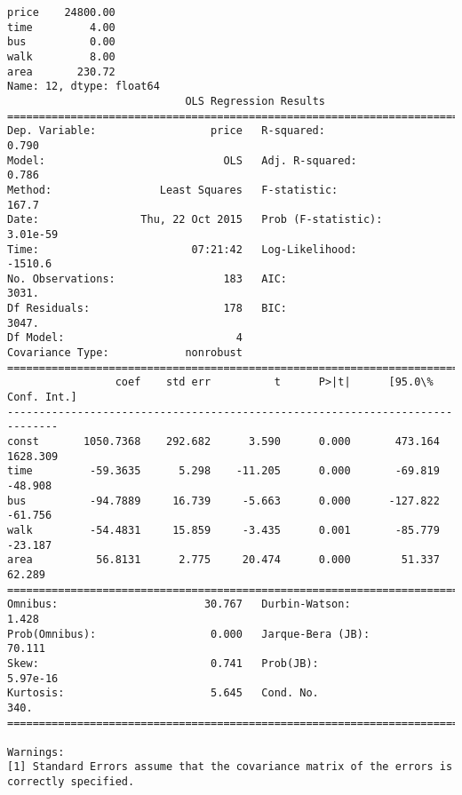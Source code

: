 \documentclass[a4paper,dvipdfmx]{jsarticle}
\begin{document}
    \begin{Verbatim}[commandchars=\\\{\}]
price    24800.00
time         4.00
bus          0.00
walk         8.00
area       230.72
Name: 12, dtype: float64
                            OLS Regression Results                            
==============================================================================
Dep. Variable:                  price   R-squared:                       0.790
Model:                            OLS   Adj. R-squared:                  0.786
Method:                 Least Squares   F-statistic:                     167.7
Date:                Thu, 22 Oct 2015   Prob (F-statistic):           3.01e-59
Time:                        07:21:42   Log-Likelihood:                -1510.6
No. Observations:                 183   AIC:                             3031.
Df Residuals:                     178   BIC:                             3047.
Df Model:                           4                                         
Covariance Type:            nonrobust                                         
==============================================================================
                 coef    std err          t      P>|t|      [95.0\% Conf. Int.]
------------------------------------------------------------------------------
const       1050.7368    292.682      3.590      0.000       473.164  1628.309
time         -59.3635      5.298    -11.205      0.000       -69.819   -48.908
bus          -94.7889     16.739     -5.663      0.000      -127.822   -61.756
walk         -54.4831     15.859     -3.435      0.001       -85.779   -23.187
area          56.8131      2.775     20.474      0.000        51.337    62.289
==============================================================================
Omnibus:                       30.767   Durbin-Watson:                   1.428
Prob(Omnibus):                  0.000   Jarque-Bera (JB):               70.111
Skew:                           0.741   Prob(JB):                     5.97e-16
Kurtosis:                       5.645   Cond. No.                         340.
==============================================================================

Warnings:
[1] Standard Errors assume that the covariance matrix of the errors is correctly specified.
    \end{Verbatim}
\end{document}
